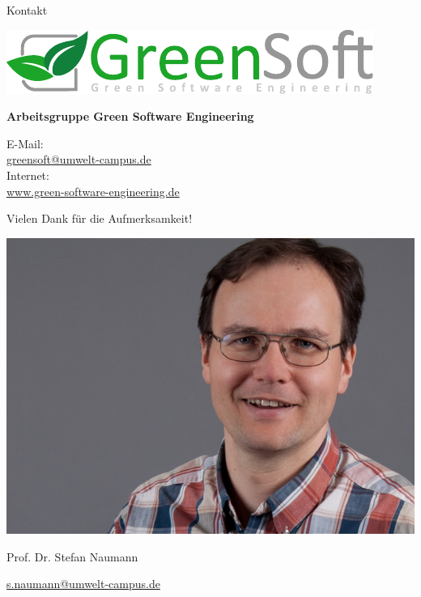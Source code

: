 \documentclass[10pt,aspectratio=169]{beamer}
\let\raggedright=\RaggedRight
\begin{document}
\begin{frame}{Kontakt}
\begin{minipage}{0.49\linewidth}
	\includegraphics[width=0.6\linewidth]{assets/logo_light.pdf}
	
	\vspace{0.8cm}
	\raggedright

	\textbf{Arbeitsgruppe Green Software Engineering}
	
	\vspace{0.2cm}
	
	E-Mail:\\
    \href{mailto:greensoft@umwelt-campus.de}{greensoft@umwelt-campus.de}\\[0.2cm]
	Internet:\\
    \url{www.green-software-engineering.de}\\
	\vspace{1.0cm}
	
	\large Vielen Dank für die Aufmerksamkeit!\\
\end{minipage}
\begin{minipage}{0.248\linewidth}

\vspace{0.2cm}

\includegraphics[width=0.9\linewidth]{assets/Stefan.jpeg}

\fontsize{6}{6}\selectfont
Prof. Dr. Stefan Naumann

\href{mailto:s.naumann@umwelt-campus.de}{s.naumann@umwelt-campus.de}


\end{minipage}
\end{frame}
\end{document}
